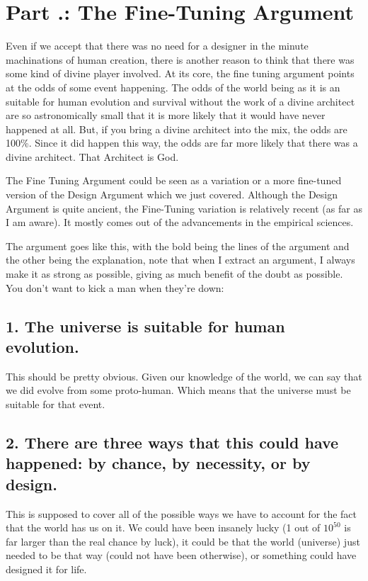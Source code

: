 \section{Part \thechapcount.\theseccount: The Fine-Tuning Argument}
Even if we accept that there was no need for a designer in the minute machinations of human creation, there is another reason to think that there was some kind of divine player involved. At its core, the fine tuning argument points at the odds of some event happening. The odds of the world being as it is an suitable for human evolution and survival without the work of a divine architect are so astronomically small that it is more likely that it would have never happened at all. But, if you bring a divine architect into the mix, the odds are 100\%. Since it did happen this way, the odds are far more likely that there was a divine architect. That Architect is God.

The Fine Tuning Argument could be seen as a variation or a more fine-tuned version of the Design Argument which we just covered. Although the Design Argument is quite ancient, the Fine-Tuning variation is relatively recent (as far as I am aware). It mostly comes out of the advancements in the empirical sciences. 

The argument goes like this, with the bold being the lines of the argument and the other being the explanation, note that when I extract an argument, I always make it as strong as possible, giving as much benefit of the doubt as possible. You don't want to kick a man when they're down:

\subsection{1. The universe is suitable for human evolution.}

This should be pretty obvious. Given our knowledge of the world, we can say that we did evolve from some proto-human. Which means that the universe must be suitable for that event. 

\subsection{2. There are three ways that this could have happened: by chance, by necessity, or by design.}

This is supposed to cover all of the possible ways we have to account for the fact that the world has us on it. We could have been insanely lucky (1 out of $10^{50}$ is far larger than the real chance by luck), it could be that the world (universe) just needed to be that way (could not have been otherwise), or something could have designed it for life. 

